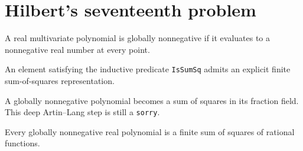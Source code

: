 \section{Hilbert's seventeenth problem}

\begin{definition}
\label{def:h17-nonnegative}
\leanok
A real multivariate polynomial is globally nonnegative if it evaluates to a nonnegative real number at every point.
\end{definition}

\begin{lemma}
\label{lem:h17-finite-sos}
\leanok
An element satisfying the inductive predicate \texttt{IsSumSq} admits an explicit finite sum-of-squares representation.
\end{lemma}

\begin{lemma}
\label{lem:h17-artin}
\notready
{}
A globally nonnegative polynomial becomes a sum of squares in its fraction field. This deep Artin--Lang step is still a \texttt{sorry}.
\end{lemma}

\begin{theorem}
\label{thm:hilbert-17}
\notready
{}
Every globally nonnegative real polynomial is a finite sum of squares of rational functions.
\end{theorem}
